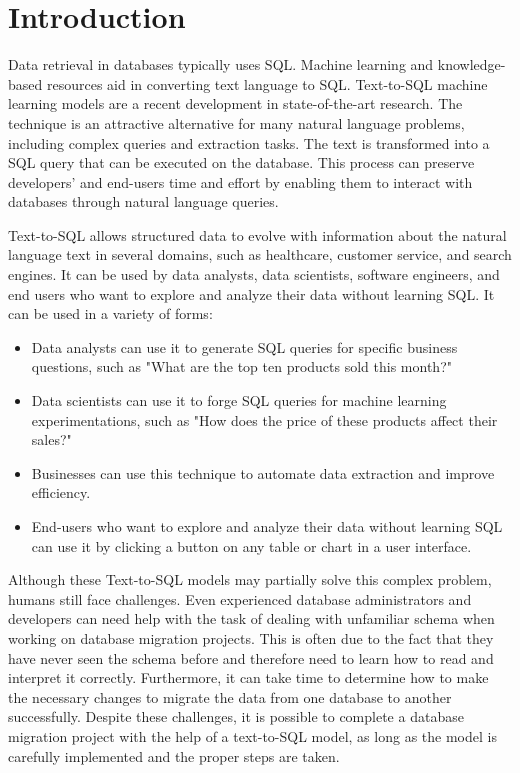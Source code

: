 \section{Introduction}

Data retrieval in databases typically uses \ac{SQL}. Machine learning and knowledge-based resources aid in converting text language to SQL. Text-to-SQL machine learning models are a recent development in state-of-the-art research. The technique is an attractive alternative for many natural language problems, including complex queries and extraction tasks. The text is transformed into a SQL query that can be executed on the database. This process can preserve developers' and end-users time and effort by enabling them to interact with databases through natural language queries.

Text-to-SQL allows structured data to evolve with information about the natural language text in several domains, such as healthcare, customer service, and search engines. It can be used by data analysts, data scientists, software engineers, and end users who want to explore and analyze their data without learning SQL. It can be used in a variety of forms:

\begin{itemize}
    \item Data analysts can use it to generate SQL queries for specific business questions, such as "What are the top ten products sold this month?"
    \item Data scientists can use it to forge SQL queries for machine learning experimentations, such as "How does the price of these products affect their sales?"
    \item Businesses can use this technique to automate data extraction and improve efficiency.
    \item End-users who want to explore and analyze their data without learning SQL can use it by clicking a button on any table or chart in a user interface.
\end{itemize}

Although these Text-to-SQL models may partially solve this complex problem, humans still face challenges. Even experienced database administrators and developers can need help with the task of dealing with unfamiliar schema when working on database migration projects. This is often due to the fact that they have never seen the schema before and therefore need to learn how to read and interpret it correctly. Furthermore, it can take time to determine how to make the necessary changes to migrate the data from one database to another successfully. Despite these challenges, it is possible to complete a database migration project with the help of a text-to-SQL model, as long as the model is carefully implemented and the proper steps are taken.

